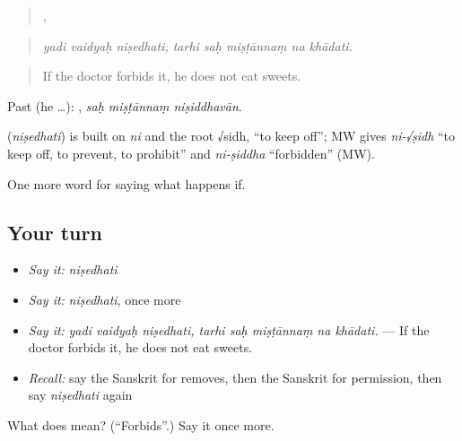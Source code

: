 \begin{quote}
  ,     
\end{quote}

\begin{quote}
\emph{yadi vaidyaḥ niṣedhati, tarhi saḥ miṣṭānnaṃ na khādati.}
\end{quote}

\begin{quote}
If the doctor forbids it, he does not eat sweets.
\end{quote}

Past (he …):   , \emph{saḥ miṣṭānnaṃ niṣiddhavān}.

\begin{cousinweb}
\textbf{} (\emph{niṣedhati}) is built on \emph{ni} and the root √sidh, \textquotedblleft{}to keep off\textquotedblright{}; MW gives \emph{ni-√ṣidh} \textquotedblleft{}to keep off, to prevent, to prohibit\textquotedblright{} and \emph{ni-ṣiddha} \textquotedblleft{}forbidden\textquotedblright{} (MW).
\end{cousinweb}

\begin{grammarlens}[title={What you've built}]
One more word for saying what happens if.
\end{grammarlens}

\subsection*{Your turn}
\begin{itemize}
\raggedright
  \item \emph{Say it:} \emph{niṣedhati}
  \item \emph{Say it:} \emph{niṣedhati}, once more
  \item \emph{Say it:} \emph{yadi vaidyaḥ niṣedhati, tarhi saḥ miṣṭānnaṃ na khādati.} — If the doctor forbids it, he does not eat sweets.
  \item \emph{Recall:} say the Sanskrit for removes, then the Sanskrit for permission, then say \emph{niṣedhati} again
\end{itemize}

\begin{tcolorbox}[breakable,colback=teal!4,colframe=teal!35!black,title={Before you move on}]
What does  mean? (\textquotedblleft{}Forbids\textquotedblright{}.) Say it once more.
\end{tcolorbox}
